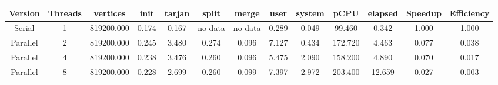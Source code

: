 \begin{tabular}{|c|c|c|c|c|c|c|c|c|c|c|c|c|}
\toprule
 Version &  Threads &   vertices &  init &  tarjan &   split &   merge &  user &  system &    pCPU &  elapsed &  Speedup &  Efficiency \\
\midrule
  Serial &        1 & 819200.000 & 0.174 &   0.167 & no data & no data & 0.289 &   0.049 &  99.460 &    0.342 &    1.000 &       1.000 \\
Parallel &        2 & 819200.000 & 0.245 &   3.480 &   0.274 &   0.096 & 7.127 &   0.434 & 172.720 &    4.463 &    0.077 &       0.038 \\
Parallel &        4 & 819200.000 & 0.238 &   3.476 &   0.260 &   0.096 & 5.475 &   2.090 & 158.200 &    4.890 &    0.070 &       0.017 \\
Parallel &        8 & 819200.000 & 0.228 &   2.699 &   0.260 &   0.099 & 7.397 &   2.972 & 203.400 &   12.659 &    0.027 &       0.003 \\
\bottomrule
\end{tabular}
